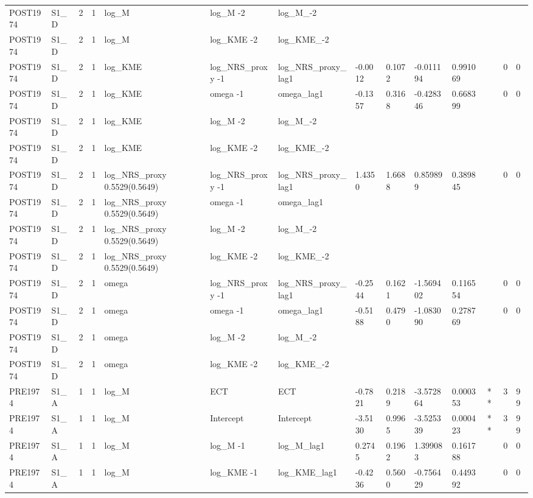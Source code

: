 \begin{tabular}{llllllllllllll}
POST1974 & S1\_D & 2 & 1 & log\_M & log\_M -2 & log\_M\_-2 &  &  &  &  &  &  &  \\
POST1974 & S1\_D & 2 & 1 & log\_M & log\_KME -2 & log\_KME\_-2 &  &  &  &  &  &  &  \\
POST1974 & S1\_D & 2 & 1 & log\_KME & log\_NRS\_proxy -1 & log\_NRS\_proxy\_lag1 & -0.0012 & 0.1072 & -0.011194 & 0.991069 &  & 0 & 0 \\
POST1974 & S1\_D & 2 & 1 & log\_KME & omega -1 & omega\_lag1 & -0.1357 & 0.3168 & -0.428346 & 0.668399 &  & 0 & 0 \\
POST1974 & S1\_D & 2 & 1 & log\_KME & log\_M -2 & log\_M\_-2 &  &  &  &  &  &  &  \\
POST1974 & S1\_D & 2 & 1 & log\_KME & log\_KME -2 & log\_KME\_-2 &  &  &  &  &  &  &  \\
POST1974 & S1\_D & 2 & 1 & log\_NRS\_proxy 0.5529(0.5649) & log\_NRS\_proxy -1 & log\_NRS\_proxy\_lag1 & 1.4350 & 1.6688 & 0.859899 & 0.389845 &  & 0 & 0 \\
POST1974 & S1\_D & 2 & 1 & log\_NRS\_proxy 0.5529(0.5649) & omega -1 & omega\_lag1 &  &  &  &  &  &  &  \\
POST1974 & S1\_D & 2 & 1 & log\_NRS\_proxy 0.5529(0.5649) & log\_M -2 & log\_M\_-2 &  &  &  &  &  &  &  \\
POST1974 & S1\_D & 2 & 1 & log\_NRS\_proxy 0.5529(0.5649) & log\_KME -2 & log\_KME\_-2 &  &  &  &  &  &  &  \\
POST1974 & S1\_D & 2 & 1 & omega & log\_NRS\_proxy -1 & log\_NRS\_proxy\_lag1 & -0.2544 & 0.1621 & -1.569402 & 0.116554 &  & 0 & 0 \\
POST1974 & S1\_D & 2 & 1 & omega & omega -1 & omega\_lag1 & -0.5188 & 0.4790 & -1.083090 & 0.278769 &  & 0 & 0 \\
POST1974 & S1\_D & 2 & 1 & omega & log\_M -2 & log\_M\_-2 &  &  &  &  &  &  &  \\
POST1974 & S1\_D & 2 & 1 & omega & log\_KME -2 & log\_KME\_-2 &  &  &  &  &  &  &  \\
PRE1974 & S1\_A & 1 & 1 & log\_M & ECT & ECT & -0.7821 & 0.2189 & -3.572864 & 0.000353 & ** & 3 & 99 \\
PRE1974 & S1\_A & 1 & 1 & log\_M & Intercept & Intercept & -3.5130 & 0.9965 & -3.525339 & 0.000423 & ** & 3 & 99 \\
PRE1974 & S1\_A & 1 & 1 & log\_M & log\_M -1 & log\_M\_lag1 & 0.2745 & 0.1962 & 1.399083 & 0.161788 &  & 0 & 0 \\
PRE1974 & S1\_A & 1 & 1 & log\_M & log\_KME -1 & log\_KME\_lag1 & -0.4236 & 0.5600 & -0.756429 & 0.449392 &  & 0 & 0 \\

\end{tabular}
